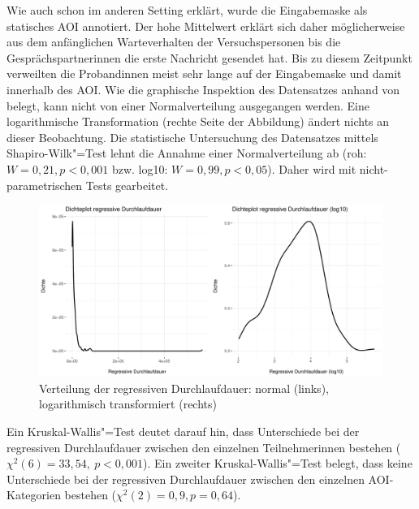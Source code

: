 Wie auch schon im anderen Setting erklärt, wurde die Eingabemaske als statisches AOI annotiert. Der hohe Mittelwert erklärt sich daher möglicherweise aus dem anfänglichen Warteverhalten der Versuchspersonen bis die Gesprächspartner{\textperiodcentered}innen die erste Nachricht gesendet hat. Bis zu diesem Zeitpunkt verweilten die Proband{\textperiodcentered}innen meist sehr lange auf der Eingabemaske und damit innerhalb des AOI. Wie die graphische Inspektion des Datensatzes anhand von  belegt, kann nicht von einer Normalverteilung ausgegangen werden. Eine logarithmische Transformation (rechte Seite der Abbildung) ändert nichts an dieser Beobachtung. Die statistische Untersuchung des Datensatzes mittels Shapiro-Wilk"=Test lehnt die Annahme einer Normalverteilung ab (roh: $W = 0,21, p < 0,001$ bzw. log10: $W = 0,99, p < 0,05$). Daher wird mit nicht-parametrischen Tests gearbeitet.


\begin{figure}
    \includegraphics[width=\textwidth]{Figures/EyeTracking/DD/ggplot_DD-RegPD_density_de}
	\caption{Verteilung der regressiven Durchlaufdauer: normal (links), logarithmisch transformiert (rechts)}
	\label{K6:fig:DeDe:density-iaregpd}
\end{figure}


\begin{sloppypar}
Ein Kruskal-Wallis"=Test deutet darauf hin, dass Unterschiede bei der regressiven Durchlaufdauer zwischen den einzelnen Teilnehmer{\textperiodcentered}innen bestehen ($\chi^2(6) = 33,54,\allowbreak\ p < 0,001$). Ein zweiter Kruskal-Wallis"=Test belegt, dass keine Unterschiede bei der regressiven Durchlaufdauer zwischen den einzelnen AOI-Kategorien bestehen ($\chi^2(2) = 0,9, p = 0,64$).
\end{sloppypar}

